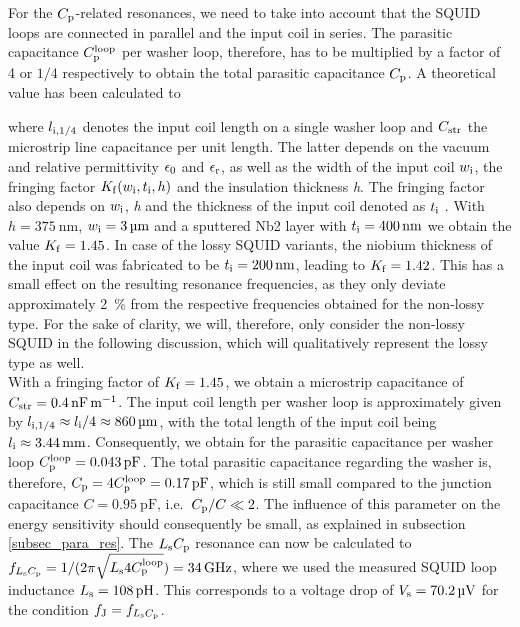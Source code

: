 For the $C_{\rm p}$-related resonances, we need to take into account that the SQUID loops are connected in parallel and the input coil in series. The parasitic capacitance $C_{\rm p}^{\rm loop}$ per washer loop, therefore, has to be multiplied by a factor of 4 or $1/4$ respectively to obtain the total parasitic capacitance $C_{\rm p}$. A theoretical value has been calculated to \cite{EnpukuI1991, EnpukuIII1992}    
  

where $l_{\rm i,1/4}$ denotes the input coil length on a single washer loop and $C_{\rm str}$
the microstrip line capacitance per unit length. The latter depends on the vacuum and relative permittivity $\epsilon_{\rm 0}$ and $\epsilon_{\rm r}$, as well as the width of the input coil $w_{\rm i}$, the fringing factor $K_{\rm f}(w_{\rm i},t_{\rm i},h)$ and the insulation thickness \textit{h}. The fringing factor also depends on $w_{\rm i}$, \textit{h} and the thickness of the input coil denoted as $t_{\rm i}$ \cite{Chang1979}. With $h=\qty{375}{\nm}$, $w_{\rm i}=\qty{3}{\um}$ and a sputtered Nb2 layer with $t_{\rm i}=\qty{400}{\nm}$ we obtain the value $K_{\rm f}=1.45$. In case of the lossy SQUID variants, the niobium thickness of the input coil was fabricated to be $t_{\rm i}=\qty{200}{\nm}$, leading to $K_{\rm f}=1.42$. This has a small effect on the resulting resonance frequencies, as they only deviate approximately \qty{2}{\percent} from the respective frequencies obtained for the non-lossy type. For the sake of clarity, we will, therefore, only consider the non-lossy SQUID in the following discussion, which will qualitatively represent the lossy type as well. \\ With a fringing factor of $K_{\rm f}=1.45$, we obtain a microstrip capacitance of \\ $C_{\rm str}=\qty{0.4}{\nF\per\meter}$. The input coil length per washer loop is approximately given by $l_{\rm i,1/4}\approx l_{\rm i}/4\approx\qty{860}{\um}$, with the total length of the input coil being $l_{\rm i}\approx\qty{3.44}{\mm}$. Consequently, we obtain for the parasitic capacitance per washer loop $C_{\rm p}^{\rm loop}=\qty{0.043}{\pF}$. The total parasitic capacitance regarding the washer is, therefore, $C_{\rm p}=4C_{\rm p}^{\rm loop}=\qty{0.17}{\pF}$, which is still small compared to the junction capacitance $C=\qty{0.95}{\pF}$, i.e.\ $C_{\rm p}/C\ll 2$. The influence of this parameter on the energy sensitivity should consequently be small, as explained in subsection \ref{subsec_para_res}. The $L_{\rm s}C_{\rm p}$ resonance can now be calculated to $f_{L_{\rm s}C_{\rm p}}=1/(2\pi\sqrt{L_{\rm s}4C_{\rm p}^{\rm loop}})=\qty{34}{\GHz}$, where we used the measured SQUID loop inductance $L_{\rm s}=\qty{108}{\pH}$. This corresponds to a voltage drop of $V_{\rm s}=\qty{70.2}{\uV}$ for the condition $f_{\rm J}=f_{L_{\rm s}C_{\rm p}}$. 

